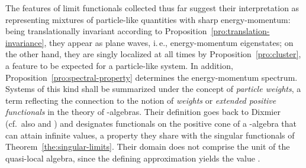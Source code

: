 \documentclass[a4paper,a4paper]{article}
\numberwithin{equation}{section}
\providecommand{\Afrak}{\mathfrak{A}}
\providecommand{\Cfrak}{\mathfrak{C}}
\providecommand{\unit}{\mathbf{1}}
\theoremstyle{definition}
\theoremstyle{plain}
\theoremstyle{remark}
\begin{document}
  The features of limit functionals collected thus far suggest their
  interpretation as representing mixtures of particle-like quantities
  with sharp energy-momentum: being translationally invariant
  according to Proposition~\ref{pro:translation-invariance}, they
  appear as plane waves, i.\,e., energy-momentum eigenstates; on the
  other hand, they are singly localized at all times by
  Proposition~\ref{pro:cluster}, a feature to be expected for a
  particle-like system. In addition,
  Proposition~\ref{pro:spectral-property} determines the
  energy-momentum spectrum. Systems of this kind shall be summarized
  under the concept of \emph{particle weights}, a term reflecting the
  connection to the notion of \emph{weights} or \emph{extended
    positive functionals} in the theory of \coordHE{}-algebras. Their
  definition goes back to Dixmier \cite[Section~I.4.2]{dixmier:1981}
  (cf.~also \cite[Section~5.1]{pedersen:1979} and
  \cite{pedersen:1966}) and designates functionals on the positive
  cone \myHighlight{$\Afrak^+$}\coordHE{} of a \coordHE{}-algebra \myHighlight{$\Afrak$}\coordHE{} that can attain infinite
  values, a property they share with the singular functionals of
  Theorem~\ref{the:singular-limits}. Their domain \myHighlight{$\Cfrak$}\coordHE{} does not
  comprise the unit \myHighlight{$\unit$}\coordHE{} of the quasi-local algebra, since the
  defining approximation yields the value \myHighlight{$\sigma ( \unit ) = +
  \infty$}\coordHE{}.
    
\end{document}

